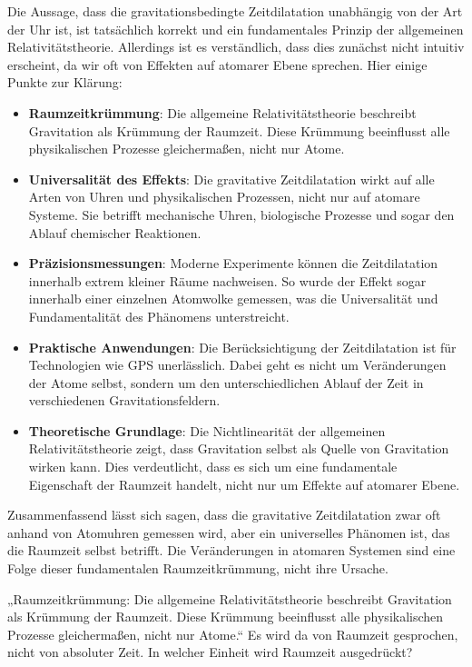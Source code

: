 \documentclass[a4paper,12pt]{article}
\begin{document}
	Die Aussage, dass die gravitationsbedingte Zeitdilatation unabhängig von der Art der Uhr ist, ist tatsächlich korrekt und ein fundamentales Prinzip der allgemeinen Relativitätstheorie. Allerdings ist es verständlich, dass dies zunächst nicht intuitiv erscheint, da wir oft von Effekten auf atomarer Ebene sprechen. Hier einige Punkte zur Klärung:
	\begin{itemize}
		\item \textbf{Raumzeitkrümmung}: Die allgemeine Relativitätstheorie beschreibt Gravitation als Krümmung der Raumzeit. Diese Krümmung beeinflusst alle physikalischen Prozesse gleichermaßen, nicht nur Atome.
		\item \textbf{Universalität des Effekts}: Die gravitative Zeitdilatation wirkt auf alle Arten von Uhren und physikalischen Prozessen, nicht nur auf atomare Systeme. Sie betrifft mechanische Uhren, biologische Prozesse und sogar den Ablauf chemischer Reaktionen.
		\item \textbf{Präzisionsmessungen}: Moderne Experimente können die Zeitdilatation innerhalb extrem kleiner Räume nachweisen. So wurde der Effekt sogar innerhalb einer einzelnen Atomwolke gemessen, was die Universalität und Fundamentalität des Phänomens unterstreicht.
		\item \textbf{Praktische Anwendungen}: Die Berücksichtigung der Zeitdilatation ist für Technologien wie GPS unerlässlich. Dabei geht es nicht um Veränderungen der Atome selbst, sondern um den unterschiedlichen Ablauf der Zeit in verschiedenen Gravitationsfeldern.
		\item \textbf{Theoretische Grundlage}: Die Nichtlinearität der allgemeinen Relativitätstheorie zeigt, dass Gravitation selbst als Quelle von Gravitation wirken kann. Dies verdeutlicht, dass es sich um eine fundamentale Eigenschaft der Raumzeit handelt, nicht nur um Effekte auf atomarer Ebene.
	\end{itemize}
	Zusammenfassend lässt sich sagen, dass die gravitative Zeitdilatation zwar oft anhand von Atomuhren gemessen wird, aber ein universelles Phänomen ist, das die Raumzeit selbst betrifft. Die Veränderungen in atomaren Systemen sind eine Folge dieser fundamentalen Raumzeitkrümmung, nicht ihre Ursache.
	
	„Raumzeitkrümmung: Die allgemeine Relativitätstheorie beschreibt Gravitation als Krümmung der Raumzeit. Diese Krümmung beeinflusst alle physikalischen Prozesse gleichermaßen, nicht nur Atome.“ Es wird da von Raumzeit gesprochen, nicht von absoluter Zeit. In welcher Einheit wird Raumzeit ausgedrückt?
	
\end{document}
